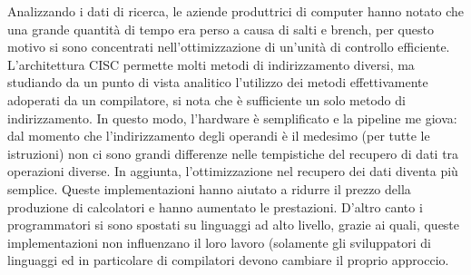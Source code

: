 \documentclass{article}
\begin{document}
Analizzando i dati di ricerca, le aziende produttrici di computer hanno notato che una grande quantità di tempo era perso a causa di salti e brench, per questo motivo si sono concentrati nell'ottimizzazione di un'unità di controllo efficiente.\\
L'architettura CISC permette molti metodi di indirizzamento diversi, ma studiando da un punto di vista analitico l'utilizzo dei metodi effettivamente adoperati da un compilatore, si nota che è sufficiente un solo metodo di indirizzamento. In questo modo, l'hardware è semplificato e la pipeline me giova: dal momento che l'indirizzamento degli operandi è il medesimo (per tutte le istruzioni) non ci sono grandi differenze nelle tempistiche del recupero di dati tra operazioni diverse. In aggiunta, l'ottimizzazione nel recupero dei dati diventa più semplice. Queste implementazioni hanno aiutato a ridurre il prezzo della produzione di calcolatori e hanno aumentato le prestazioni. D'altro canto i programmatori si sono spostati su linguaggi ad alto livello, grazie ai quali, queste implementazioni non influenzano il loro lavoro (solamente gli sviluppatori di linguaggi ed in particolare di compilatori devono cambiare il proprio approccio.\\
%

\end{document}
